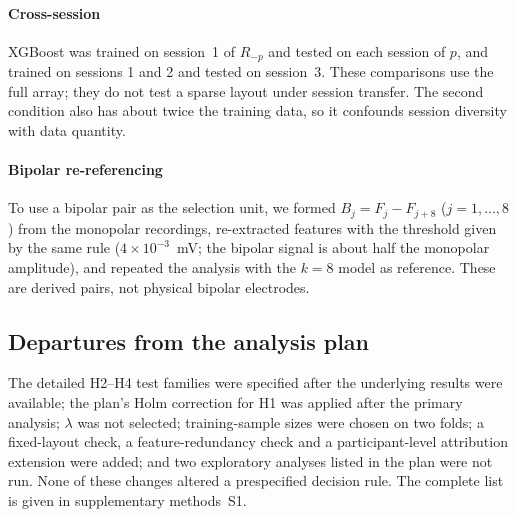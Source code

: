 \paragraph{Cross-session} XGBoost was trained on session~1 of $R_{-p}$ and tested on each session of $p$, and trained on sessions 1 and 2 and tested on session~3. These comparisons use the full array; they do not test a sparse layout under session transfer. The second condition also has about twice the training data, so it confounds session diversity with data quantity.

\paragraph{Bipolar re-referencing} To use a bipolar pair as the selection unit, we formed $B_j = F_j - F_{j+8}$ ($j = 1, \ldots, 8$) from the monopolar recordings, re-extracted features with the threshold given by the same rule ($4 \times 10^{-3}$~mV; the bipolar signal is about half the monopolar amplitude), and repeated the analysis with the $k = 8$ model as reference. These are derived pairs, not physical bipolar electrodes.

\subsection{Departures from the analysis plan}
\label{sec:deviations}
The detailed H2--H4 test families were specified after the underlying results were available; the plan's Holm correction for H1 was applied after the primary analysis; $\lambda$ was not selected; training-sample sizes were chosen on two folds; a fixed-layout check, a feature-redundancy check and a participant-level attribution extension were added; and two exploratory analyses listed in the plan were not run. None of these changes altered a prespecified decision rule. The complete list is given in supplementary methods~S1.
